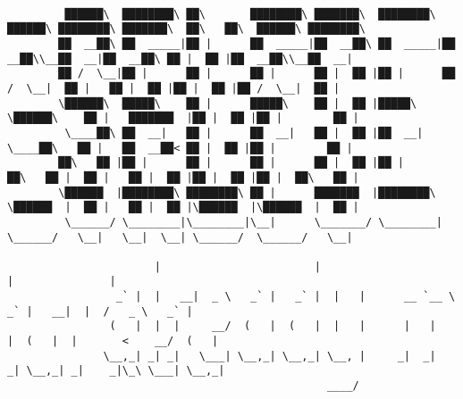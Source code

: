 \documentclass[varwidth=\maxdimen,margin=0.5cm,multi={verbatim}]{standalone}
\begin{document}
\begin{verbatim}

         ██████\  ████████\ ██\       ████████\ ███████\  ████████\  ██████\ ████████\ ███████\  ██\   ██\  ██████\ ████████\ 
        ██  __██\ ██  _____|██ |      ██  _____|██  __██\ ██  _____|██  __██\\__██  __|██  __██\ ██ |  ██ |██  __██\\__██  __|
        ██ /  \__|██ |      ██ |      ██ |      ██ |  ██ |██ |      ██ /  \__|  ██ |   ██ |  ██ |██ |  ██ |██ /  \__|  ██ |   
        \██████\  █████\    ██ |      █████\    ██ |  ██ |█████\    \██████\    ██ |   ███████  |██ |  ██ |██ |        ██ |   
         \____██\ ██  __|   ██ |      ██  __|   ██ |  ██ |██  __|    \____██\   ██ |   ██  __██< ██ |  ██ |██ |        ██ |   
        ██\   ██ |██ |      ██ |      ██ |      ██ |  ██ |██ |      ██\   ██ |  ██ |   ██ |  ██ |██ |  ██ |██ |  ██\   ██ |   
        \██████  |████████\ ████████\ ██ |      ███████  |████████\ \██████  |  ██ |   ██ |  ██ |\██████  |\██████  |  ██ |   
         \______/ \________|\________|\__|      \_______/ \________| \______/   \__|   \__|  \__| \______/  \______/   \__|

                       |                        |                                     |               | 
                 _` |  |   __|  _ \   _` |   _` |  |   |      __ `__ \    _` |   __|  |  /   _ \   _` | 
                (   |  |  |     __/  (   |  (   |  |   |      |   |   |  (   |  |       <    __/  (   | 
               \__,_| _| _|   \___| \__,_| \__,_| \__, |     _|  _|  _| \__,_| _|    _|\_\ \___| \__,_| 
                                                  ____/



\end{verbatim}
\end{document}
